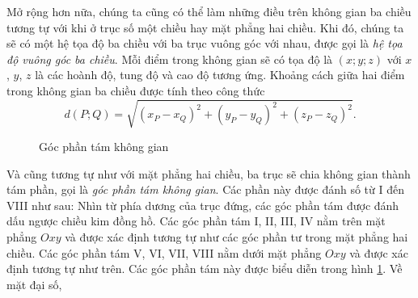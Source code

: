 \documentclass[a4paper, titlepage, openany]{book}
\begin{document}
Mở rộng hơn nữa, chúng ta cũng có thể làm những điều trên không gian ba chiều tương tự với khi ở trục số một chiều hay mặt phẳng hai chiều. Khi đó, chúng ta sẽ có một hệ tọa độ ba chiều với ba trục vuông góc với nhau, được gọi là \emph{hệ tọa độ vuông góc ba chiều}. Mỗi điểm trong không gian sẽ có tọa độ là $(x;y;z)$ với $x$, $y$, $z$ là các hoành độ, tung độ và cao độ tương ứng. Khoảng cách giữa hai điểm trong không gian ba chiều được tính theo công thức $$d(P;Q)=\sqrt{(x_P-x_Q)^2+(y_P-y_Q)^2+(z_P-z_Q)^2}.$$

\begin{figure}[h]
   \centering
   \caption{Góc phần tám không gian}
   \label{fig:goc phan tam khong gian}
\end{figure}

Và cũng tương tự như với mặt phẳng hai chiều, ba trục sẽ chia không gian thành tám phần, gọi là \emph{góc phần tám không gian}. Các phần này được đánh số từ I đến VIII như sau: Nhìn từ phía dương của trục đứng, các góc phần tám được đánh dấu ngược chiều kim đồng hồ. Các góc phần tám I, II, III, IV nằm trên mặt phẳng $Oxy$ và được xác định tương tự như các góc phần tư trong mặt phẳng hai chiều. Các góc phần tám V, VI, VII, VIII nằm dưới mặt phẳng $Oxy$ và được xác định tương tự như trên. Các góc phần tám này được biểu diễn trong hình \ref{fig:goc phan tam khong gian}. Về mặt đại số, 
\end{document}

